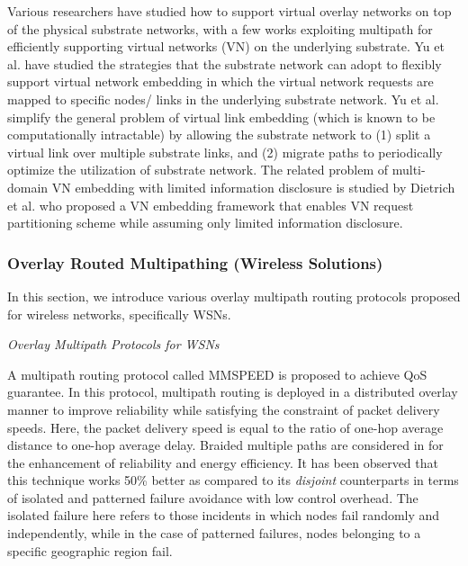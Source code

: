 \documentclass[10pt]{IEEEtran}
\begin{document}
Various researchers have studied how to support virtual overlay networks on top of the physical substrate networks, with a few works exploiting multipath for efficiently supporting virtual networks (VN) on the underlying substrate. Yu et al. \cite{yu2008rethinking} have studied the strategies that the substrate network can adopt to flexibly support virtual network embedding in which the virtual network requests are mapped to specific nodes/ links in the underlying substrate network. Yu et al. simplify the general problem of virtual link embedding (which is known to be computationally intractable) by allowing the substrate network to (1) split a virtual link over multiple substrate links, and (2) migrate paths to periodically optimize the utilization of substrate network. The related problem of multi-domain VN embedding with limited information disclosure is studied by Dietrich et al. \cite{dietrich2013multi} who proposed a VN embedding framework that enables VN request partitioning scheme while assuming only limited information disclosure.

\vspace{2mm}
\subsubsection{Overlay Routed Multipathing (Wireless Solutions)}

In this section, we introduce various overlay multipath routing protocols proposed for wireless networks, specifically WSNs.

\vspace{2mm}
\textit{Overlay Multipath Protocols for WSNs}
\vspace{1mm}

A multipath routing protocol called MMSPEED \cite{felemban2006mmspeed} is proposed to achieve QoS guarantee. In this protocol, multipath routing is deployed in a distributed overlay manner to improve reliability while satisfying the constraint of packet delivery speeds. Here, the packet delivery speed is equal to the ratio of one-hop average distance to one-hop average delay. Braided multiple paths are considered in \cite{ganesan2001highly} for the enhancement of reliability and energy efficiency. It has been observed that this technique works 50\% better as compared to its \textit{disjoint} counterparts in terms of isolated and patterned failure avoidance with low control overhead. The isolated failure here refers to those incidents in which nodes fail randomly and independently, while in the case of patterned failures, nodes belonging to a specific geographic region fail.
\end{document}

